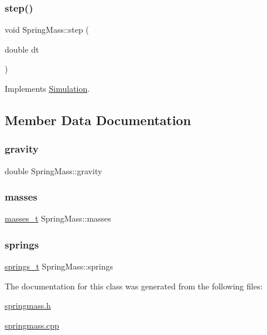 \subsubsection{\texorpdfstring{step()}{step()}}
{\footnotesize\ttfamily void Spring\+Mass\+::step (\begin{DoxyParamCaption}\item[{double}]{dt }\end{DoxyParamCaption})\hspace{0.3cm}{\ttfamily [virtual]}}



Implements \hyperlink{classSimulation_a1040e261c063e307871fb1dfe664fb0a}{Simulation}.



\subsection{Member Data Documentation}
\mbox{\label{classSpringMass_a8153c487713e1eea29caf109bc49e373}} 
\subsubsection{\texorpdfstring{gravity}{gravity}}
{\footnotesize\ttfamily double Spring\+Mass\+::gravity\hspace{0.3cm}{\ttfamily [protected]}}

\mbox{\label{classSpringMass_a92b9fedfa5acfae0beb0cbc636407c6f}} 
\subsubsection{\texorpdfstring{masses}{masses}}
{\footnotesize\ttfamily \hyperlink{classSpringMass_a4871d5df726e2e6b656d1b1c5fdfecbe}{masses\+\_\+t} Spring\+Mass\+::masses\hspace{0.3cm}{\ttfamily [protected]}}

\mbox{\label{classSpringMass_a40cdaa9d3d2a622579d8d8b2b356b69b}} 
\subsubsection{\texorpdfstring{springs}{springs}}
{\footnotesize\ttfamily \hyperlink{classSpringMass_a31c09e1ecad3d85488d557b76eb633e5}{springs\+\_\+t} Spring\+Mass\+::springs\hspace{0.3cm}{\ttfamily [protected]}}



The documentation for this class was generated from the following files\+:\begin{DoxyCompactItemize}
\item 
\hyperlink{springmass_8h}{springmass.\+h}\item 
\hyperlink{springmass_8cpp}{springmass.\+cpp}\end{DoxyCompactItemize}
